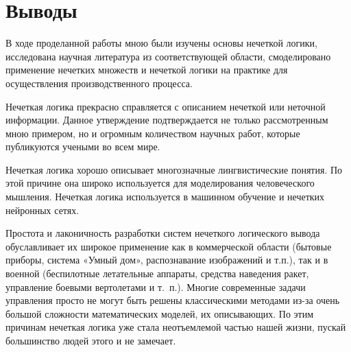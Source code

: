\documentclass[a4paper,12pt]{article}
\begin{document}
	
	\section{Выводы}
	
	В ходе проделанной работы мною были изучены основы нечеткой логики, исследована научная литература из соответствующей области, смоделировано применение нечетких множеств и нечеткой логики на практике для осуществления производственного процесса.
	
	Нечеткая логика прекрасно справляется с описанием нечеткой или неточной информации. Данное утверждение подтверждается не только рассмотренным мною примером, но и огромным количеством научных работ, которые публикуются учеными во всем мире.
	
	Нечеткая логика хорошо описывает многозначные лингвистические понятия. По этой причине она широко используется для моделирования человеческого мышления. Нечеткая логика используется в машинном обучение и нечетких нейронных сетях. 
	
	Простота и лаконичность разработки систем нечеткого логического вывода обуславливает их широкое применение как в коммерческой области (бытовые приборы, система «Умный дом», распознавание изображений и т.п.), так и в военной (беспилотные летательные аппараты, средства наведения ракет, управление боевыми вертолетами и т. п.).
	Многие современные задачи управления просто не могут быть решены классическими методами из-за очень большой сложности математических моделей, их описывающих. По этим причинам нечеткая логика уже стала неотъемлемой частью нашей жизни, пускай большинство людей этого и не замечает.
	
	\newpage
	\printbibliography
\end{document}
